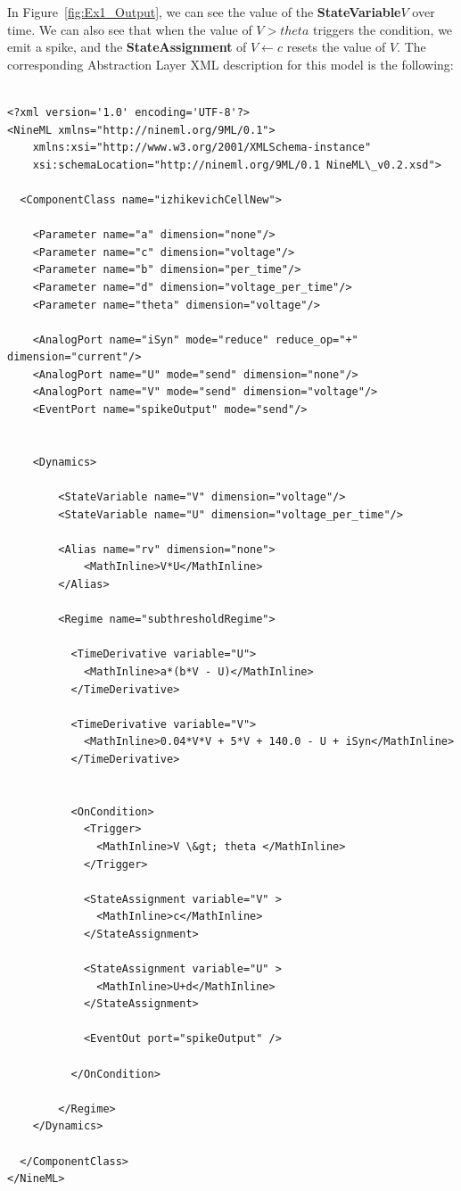\documentclass{article}
\newcommand{\StateVariable}{{\bf{StateVariable}}\xspace}
\newcommand{\StateAssignment}{{\bf{StateAssignment}}\xspace}
\begin{document}
In Figure~\ref{fig:Ex1_Output}, we can see the value of the \StateVariable $V$
over time. We can also see that when the value of $V>theta$ triggers the
condition, we emit a spike, and the \StateAssignment of $V \leftarrow c$ resets
the value of $V$.
%
\noindent
The corresponding Abstraction Layer XML description for this model is the following:
%
\begin{lstlisting}

<?xml version='1.0' encoding='UTF-8'?>
<NineML xmlns="http://nineml.org/9ML/0.1">
    xmlns:xsi="http://www.w3.org/2001/XMLSchema-instance"
    xsi:schemaLocation="http://nineml.org/9ML/0.1 NineML\_v0.2.xsd">

  <ComponentClass name="izhikevichCellNew">

    <Parameter name="a" dimension="none"/>
    <Parameter name="c" dimension="voltage"/>
    <Parameter name="b" dimension="per_time"/>
    <Parameter name="d" dimension="voltage_per_time"/>
    <Parameter name="theta" dimension="voltage"/>

    <AnalogPort name="iSyn" mode="reduce" reduce_op="+" dimension="current"/>
    <AnalogPort name="U" mode="send" dimension="none"/>
    <AnalogPort name="V" mode="send" dimension="voltage"/>
    <EventPort name="spikeOutput" mode="send"/>


    <Dynamics>

        <StateVariable name="V" dimension="voltage"/>
        <StateVariable name="U" dimension="voltage_per_time"/>

        <Alias name="rv" dimension="none">
            <MathInline>V*U</MathInline>
        </Alias>

        <Regime name="subthresholdRegime">

          <TimeDerivative variable="U">
            <MathInline>a*(b*V - U)</MathInline>
          </TimeDerivative>

          <TimeDerivative variable="V">
            <MathInline>0.04*V*V + 5*V + 140.0 - U + iSyn</MathInline>
          </TimeDerivative>


          <OnCondition>
            <Trigger>
              <MathInline>V \&gt; theta </MathInline>
            </Trigger>

            <StateAssignment variable="V" >
              <MathInline>c</MathInline>
            </StateAssignment>

            <StateAssignment variable="U" >
              <MathInline>U+d</MathInline>
            </StateAssignment>

            <EventOut port="spikeOutput" />

          </OnCondition>

        </Regime>
    </Dynamics>

  </ComponentClass>
</NineML>
\end{lstlisting}
\end{document}
